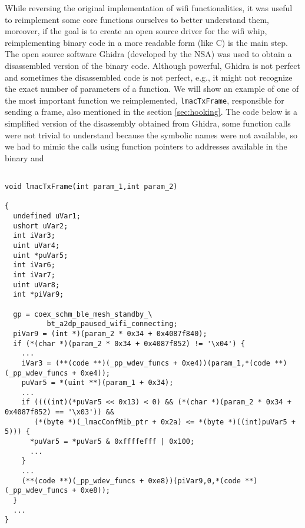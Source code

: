 While reversing the original implementation of wifi functionalities, it was useful to reimplement 
some core functions ourselves to better understand them, moreover, if the goal is to create
an open source driver for the wifi whip, reimplementing binary code in a more readable form
(like C) is the main step.
The open source software Ghidra (developed by the NSA) was used to obtain 
a disassembled version of the binary code. Although powerful, Ghidra is not perfect and
sometimes the disassembled code is not perfect, e.g., it might not recognize the exact
number of parameters of a function. 
We will show an example of one of the most important function we reimplemented,
\texttt{lmacTxFrame}, responsible for sending a frame, also mentioned in the section \ref{sec:hooking}.
The code below is a simplified version of the disassembly obtained from Ghidra,
some function calls were not trivial to understand because
the symbolic names were not available, so we had to mimic the calls
using function pointers to addresses available in the binary and 


\begin{lstlisting}

void lmacTxFrame(int param_1,int param_2)

{
  undefined uVar1;
  ushort uVar2;
  int iVar3;
  uint uVar4;
  uint *puVar5;
  int iVar6;
  int iVar7;
  uint uVar8;
  int *piVar9;
  
  gp = coex_schm_ble_mesh_standby_\
          bt_a2dp_paused_wifi_connecting;
  piVar9 = (int *)(param_2 * 0x34 + 0x4087f840);
  if (*(char *)(param_2 * 0x34 + 0x4087f852) != '\x04') {
    ...
    iVar3 = (**(code **)(_pp_wdev_funcs + 0xe4))(param_1,*(code **)(_pp_wdev_funcs + 0xe4));
    puVar5 = *(uint **)(param_1 + 0x34);
    ...
    if ((((int)(*puVar5 << 0x13) < 0) && (*(char *)(param_2 * 0x34 + 0x4087f852) == '\x03')) &&
       (*(byte *)(_lmacConfMib_ptr + 0x2a) <= *(byte *)((int)puVar5 + 5))) {
      *puVar5 = *puVar5 & 0xffffefff | 0x100;
      ...
    }
    ...
    (**(code **)(_pp_wdev_funcs + 0xe8))(piVar9,0,*(code **)(_pp_wdev_funcs + 0xe8));
  }
  ...
}
\end{lstlisting}


